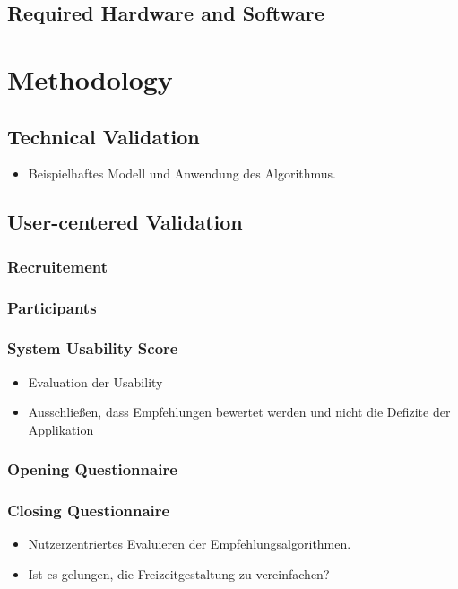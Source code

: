 \documentclass[12pt,numbers=noenddot,parskip,bibliography=totocnumbered,listof=totocnumbered]{scrreprt}
\begin{document}
\section{Required Hardware and Software}

\chapter{Methodology}

\section{Technical Validation}
\begin{itemize} 
	\item Beispielhaftes Modell und Anwendung des Algorithmus.
\end{itemize} 

\section{User-centered Validation}

\subsection{Recruitement}

\subsection{Participants}

\subsection{System Usability Score}
\begin{itemize} 
	\item Evaluation der Usability
	\item Ausschließen, dass Empfehlungen bewertet werden und nicht die Defizite der Applikation
\end{itemize} 

\subsection{Opening Questionnaire}

\subsection{Closing Questionnaire}
\begin{itemize} 
	\item Nutzerzentriertes Evaluieren der Empfehlungsalgorithmen.
	\item Ist es gelungen, die Freizeitgestaltung zu vereinfachen?
\end{itemize} 
\end{document}
